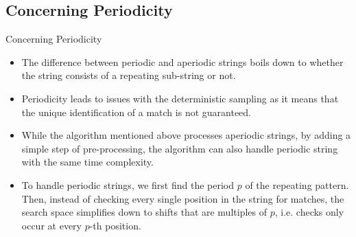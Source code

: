 \documentclass{beamer}
\begin{document}


\subsection{Concerning Periodicity}
\begin{frame}{Concerning Periodicity}
  \begin{itemize}
    \item The difference between periodic and aperiodic strings boils down to whether the string consists of a repeating sub-string or not.
    \item Periodicity leads to issues with the deterministic sampling as it means that the unique identification of a match is not guaranteed.
    \item While the algorithm mentioned above processes aperiodic strings, by adding a simple step of pre-processing, the algorithm can also handle periodic string with the same time complexity.

    \item To handle periodic strings, we first find the period $p$ of the repeating pattern. Then, instead of checking every single position in the string for matches, the search space simplifies down to shifts that are multiples of $p$, i.e. checks only occur at every $p$-th position.
  \end{itemize}
\end{frame}
\end{document}
